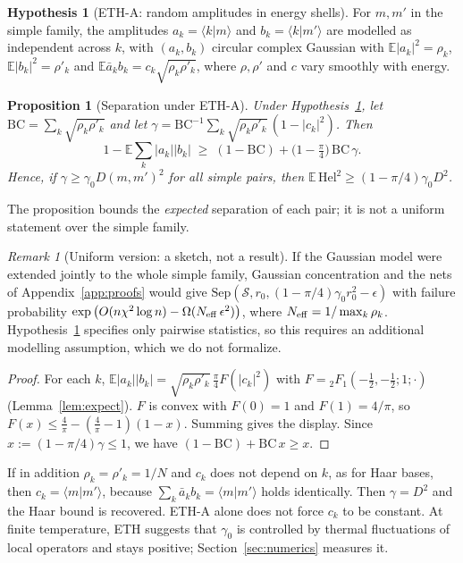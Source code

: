 \documentclass[11pt]{article}
\newtheorem{proposition}[theorem]{Proposition}
\theoremstyle{definition}
\newtheorem{hypothesis}[theorem]{Hypothesis}
\theoremstyle{remark}
\newtheorem{remark}[theorem]{Remark}
\newcommand{\braket}[2]{\langle #1|#2\rangle}
\newcommand{\Hel}{\mathrm{Hel}}
\newcommand{\E}{\mathbb{E}}
\begin{document}
\begin{hypothesis}[ETH-A: random amplitudes in energy shells]\label{hyp:eth}
For $m,m'$ in the simple family, the amplitudes $a_k=\braket{k}{m}$ and $b_k=\braket{k}{m'}$ are modelled as independent across $k$, with $(a_k,b_k)$ circular complex Gaussian with $\E|a_k|^2=\rho_k$, $\E|b_k|^2=\rho'_k$ and $\E\bar a_kb_k=c_k\sqrt{\rho_k\rho'_k}$, where $\rho,\rho'$ and $c$ vary smoothly with energy.
\end{hypothesis}

\begin{proposition}[Separation under ETH-A]\label{prop:eth}
Under Hypothesis~\ref{hyp:eth}, let $\mathrm{BC}=\sum_k\sqrt{\rho_k\rho'_k}$ and let $\gamma=\mathrm{BC}^{-1}\sum_k\sqrt{\rho_k\rho'_k}\,(1-|c_k|^2)$. Then
\[
1-\E\sum_k|a_k||b_k|\;\ge\;(1-\mathrm{BC})+\big(1-\tfrac\pi4\big)\,\mathrm{BC}\,\gamma .
\]
Hence, if $\gamma\ge\gamma_0D(m,m')^2$ for all simple pairs, then $\E\,\Hel^2\ge(1-\pi/4)\gamma_0D^2$.
\end{proposition}
The proposition bounds the \emph{expected} separation of each pair; it is not a uniform statement over the simple family.

\begin{remark}[Uniform version: a sketch, not a result]\label{rem:ethuniform}
If the Gaussian model were extended jointly to the whole simple family, Gaussian concentration and the nets of Appendix~\ref{app:proofs} would give $\mathrm{Sep}(\mathcal S,r_0,(1-\pi/4)\gamma_0r_0^2-\epsilon)$ with failure probability $\exp\big(O(n\chi^2\log n)-\Omega(N_{\rm eff}\,\epsilon^2)\big)$, where $N_{\rm eff}=1/\max_k\rho_k$. Hypothesis~\ref{hyp:eth} specifies only pairwise statistics, so this requires an additional modelling assumption, which we do not formalize.
\end{remark}
\begin{proof}
For each $k$, $\E|a_k||b_k|=\sqrt{\rho_k\rho'_k}\,\frac\pi4F(|c_k|^2)$ with $F={}_2F_1(-\frac12,-\frac12;1;\cdot)$ (Lemma~\ref{lem:expect}). $F$ is convex with $F(0)=1$ and $F(1)=4/\pi$, so $F(x)\le\frac4\pi-(\frac4\pi-1)(1-x)$. Summing gives the display. Since $x:=(1-\pi/4)\gamma\le1$, we have $(1-\mathrm{BC})+\mathrm{BC}\,x\ge x$.
\end{proof}

If in addition $\rho_k=\rho'_k=1/N$ and $c_k$ does not depend on $k$, as for Haar bases, then $c_k=\braket{m}{m'}$, because $\sum_k\bar a_kb_k=\braket{m}{m'}$ holds identically. Then $\gamma=D^2$ and the Haar bound is recovered. ETH-A alone does not force $c_k$ to be constant. At finite temperature, ETH suggests that $\gamma_0$ is controlled by thermal fluctuations of local operators and stays positive; Section~\ref{sec:numerics} measures it.
\end{document}
